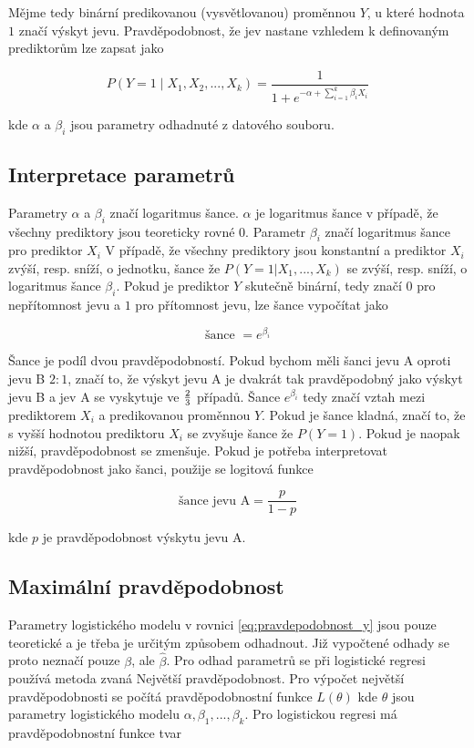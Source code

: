 Mějme tedy binární predikovanou (vysvětlovanou) proměnnou $Y$, u které hodnota $1$ značí výskyt jevu. Pravděpodobnost, že jev nastane
vzhledem k definovaným prediktorům lze zapsat jako

\begin{equation}
    \label{eq:pravdepodobnost_y}
    P(Y = 1 \mid X_1, X_2, ..., X_k) = \frac{1}{1 + e^{-\alpha + \sum_{i=1}^k \beta_i X_i}}
\end{equation}

kde $\alpha$ a $\beta_i$ jsou parametry odhadnuté z datového souboru. 

\subsection{Interpretace parametrů}
Parametry $\alpha$ a $\beta_i$ značí logaritmus šance. $\alpha$ je logaritmus šance v případě, že všechny prediktory
jsou teoreticky rovné $0$. Parametr $\beta_i$ značí logaritmus šance pro prediktor $X_i$
V případě, že všechny prediktory jsou konstantní a prediktor $X_i$ zvýší, resp. sníží, o jednotku, šance že $P(Y = 1 | X_1, ..., X_k)$ se
zvýší, resp. sníží, o logaritmus šance $\beta_i$.
Pokud je prediktor $Y$ skutečně binární, tedy značí $0$ pro nepřítomnost jevu a $1$ pro přítomnost jevu,
lze šance vypočítat jako

\begin{equation}
\text{šance } = e^{\beta_i}    
\end{equation}

Šance je podíl dvou pravděpodobností. Pokud bychom měli šanci jevu A oproti jevu B $2 : 1$, značí to, že výskyt jevu A je dvakrát tak pravděpodobný
jako výskyt jevu B a jev A se vyskytuje ve $2 \over 3$ případů. Šance $e^{\beta_i}$ tedy značí vztah mezi prediktorem $X_i$ a predikovanou proměnnou $Y$. Pokud je
šance kladná, značí to, že s vyšší hodnotou prediktoru $X_i$ se zvyšuje šance že $P(Y = 1)$. Pokud je naopak nižší, pravděpodobnost se zmenšuje. Pokud je potřeba
interpretovat pravděpodobnost jako šanci, použije se logitová funkce

\begin{equation}
    \label{eq:logitova_funkce}
    \text{šance jevu A} = \frac{p}{1 - p}
\end{equation}

kde $p$ je pravděpodobnost výskytu jevu A.

\subsection{Maximální pravděpodobnost}
Parametry logistického modelu v rovnici \ref{eq:pravdepodobnost_y} jsou pouze teoretické a je třeba je určitým způsobem odhadnout. Již vypočtené odhady
se proto neznačí pouze $\beta$, ale $\hat{\beta}$. Pro odhad parametrů se při logistické regresi používá metoda zvaná Největší pravděpodobnost. Pro výpočet
největší pravděpodobnosti se počítá pravděpodobnostní funkce $L(\theta)$ kde $\theta$ jsou parametry logistického modelu $\alpha, \beta_1, ..., \beta_k$.
Pro logistickou regresi má pravděpodobnostní funkce tvar

